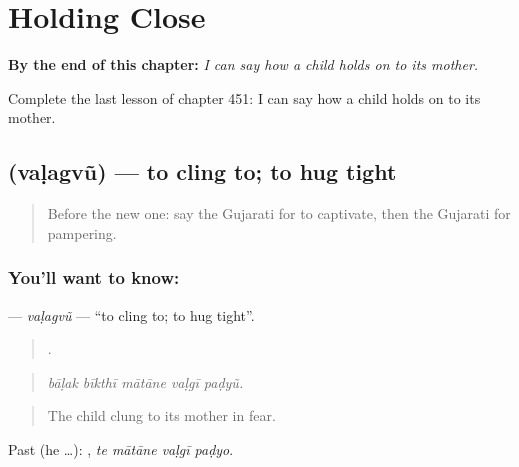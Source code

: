 
\chapter{Holding Close}
\label{ch:gu-holding-close}

\begin{chapteropening}
\textbf{By the end of this chapter:} \emph{I can say how a child holds on to its mother.}

Complete the last lesson of chapter 451: I can say how a child holds on to its mother.
\end{chapteropening}

\section[\texorpdfstring{\gu{વળગવું} (vaḷagvũ)}{વળગવું (vaḷagvũ)}]{ (vaḷagvũ) — to cling to; to hug tight}

\label{lesson:GU-C451-valagvu}



\begin{quote}
Before the new one: say the Gujarati for to captivate, then the Gujarati for pampering.
\end{quote}

\subsection*{You'll want to know: }
\textbf{} — \emph{vaḷagvũ} — \textquotedblleft{}to cling to; to hug tight\textquotedblright{}.

\begin{quote}
    .
\end{quote}

\begin{quote}
\emph{bāḷak bīkthī mātāne vaḷgī paḍyũ.}
\end{quote}

\begin{quote}
The child clung to its mother in fear.
\end{quote}

Past (he …):    , \emph{te mātāne vaḷgī paḍyo}.

